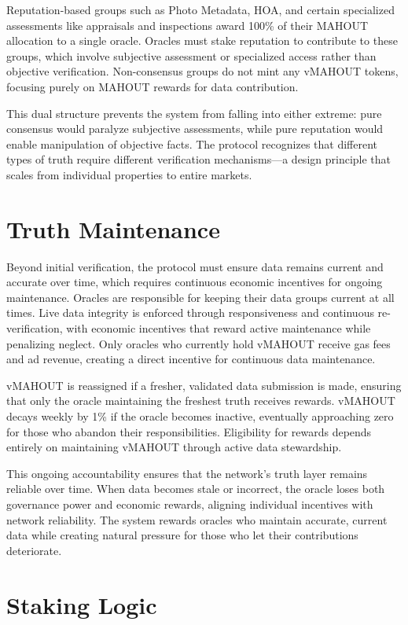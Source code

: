 Reputation-based groups such as Photo Metadata, HOA, and certain specialized assessments like appraisals and inspections award 100\% of their MAHOUT allocation to a single oracle. Oracles must stake reputation to contribute to these groups, which involve subjective assessment or specialized access rather than objective verification. Non-consensus groups do not mint any vMAHOUT tokens, focusing purely on MAHOUT rewards for data contribution.

This dual structure prevents the system from falling into either extreme: pure consensus would paralyze subjective assessments, while pure reputation would enable manipulation of objective facts. The protocol recognizes that different types of truth require different verification mechanisms---a design principle that scales from individual properties to entire markets.

\section{Truth Maintenance}

Beyond initial verification, the protocol must ensure data remains current and accurate over time, which requires continuous economic incentives for ongoing maintenance. Oracles are responsible for keeping their data groups current at all times. Live data integrity is enforced through responsiveness and continuous re-verification, with economic incentives that reward active maintenance while penalizing neglect. Only oracles who currently hold vMAHOUT receive gas fees and ad revenue, creating a direct incentive for continuous data maintenance.

vMAHOUT is reassigned if a fresher, validated data submission is made, ensuring that only the oracle maintaining the freshest truth receives rewards. vMAHOUT decays weekly by 1\% if the oracle becomes inactive, eventually approaching zero for those who abandon their responsibilities. Eligibility for rewards depends entirely on maintaining vMAHOUT through active data stewardship.

This ongoing accountability ensures that the network's truth layer remains reliable over time. When data becomes stale or incorrect, the oracle loses both governance power and economic rewards, aligning individual incentives with network reliability. The system rewards oracles who maintain accurate, current data while creating natural pressure for those who let their contributions deteriorate.

\section{Staking Logic}

